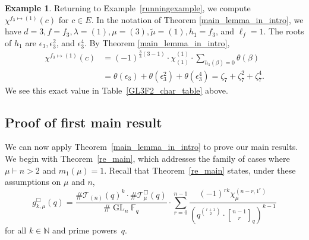 \documentclass[10pt]{article}
\theoremstyle{definition}
\newtheorem{example}[theorem]{Example}
\DeclareMathOperator{\GL}{GL}
\newcommand{\F}{\mathbb{F}}
\newcommand{\N}{\mathbb{N}}
\newcommand{\CT}{\mathcal{T}}
\newcommand{\eps}{\epsilon}
\newcommand{\te}{\theta}
\begin{document}
\begin{example}
Returning to Example~\ref{runningexample}, we compute $\chi^{f_3 \mapsto (1)} (c)$ for $c \in E$.
In the notation of Theorem \ref{main_lemma_in_intro}, we have $d = 3, f = f_3, \lambda = (1), \mu = (3), \tilde{\mu} = (1), h_1 = f_3$, and $\ell_f = 1$.
The roots of $h_1$ are $\eps_3, \eps_3^2$, and $\eps_3^4$.
By Theorem \ref{main_lemma_in_intro},
\begin{align*}
\chi^{f_3 \mapsto (1)} (c)
& =
(-1)^{\frac{3}{3}(3-1)}
\cdot
\chi^{(1)}_{(1)}
\cdot
\sum_{h_1(\beta) = 0} \te(\beta) \\
& = \te(\eps_3) + \te(\eps_3^2) + \te(\eps_3^4)
= \zeta_7 + \zeta_7^2 + \zeta_7^4.
\end{align*}
We see this exact value in Table~\ref{GL3F2_char_table} above.
\end{example}






































































\subsection{Proof of first main result}

We can now apply Theorem~\ref{main_lemma_in_intro} to prove our main results.
We begin with Theorem~\ref{re_main}, which addresses the family of cases where \(\mu \vdash n > 2\) and \(m_1(\mu) = 1\).
Recall that Theorem~\ref{re_main} states, under these assumptions on \(\mu\) and \(n\),
\begin{equation}
g_{k,\mu}^\Box(q)
=
\frac{\# \CT_{(n)} (q)^k
\cdot
\# \CT_\mu^\Box (q)}{\# \GL_n \F_q}
\cdot
\sum_{r=0}^{n-1}
\frac{(-1)^{rk} \chi^{(n-r,1^r)}_\mu}{\left ( q^{\binom{r+1}{2}} \cdot {\genfrac[]{0pt}{1}{n - 1}{r}}_{q} \right )^{k-1}}
\end{equation}
for all \(k \in \N\) and prime powers~\(q\).
\end{document}

